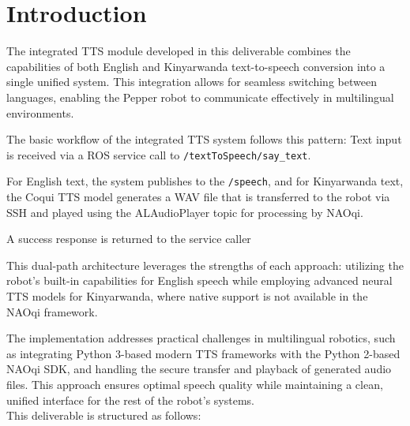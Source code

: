 \documentclass{CSSRforAfrica}
\begin{document}
\newpage
 
 
\pagebreak
\tableofcontents
\newpage


\section{Introduction}

The integrated TTS module developed in this deliverable combines the capabilities of both English and Kinyarwanda text-to-speech conversion into a single unified system. This integration allows for seamless switching between languages, enabling the Pepper robot to communicate effectively in multilingual environments.

The basic workflow of the integrated TTS system follows this pattern:
 Text input is received via a ROS service call to \texttt{/textToSpeech/say\_text}.

For English text, the system publishes to the \texttt{/speech}, and
for Kinyarwanda text, the Coqui TTS model generates a WAV file that is transferred to the robot via SSH and played using the ALAudioPlayer topic for processing by NAOqi.

 A success response is returned to the service caller

This dual-path architecture leverages the strengths of each approach: utilizing the robot's built-in capabilities for English speech while employing advanced neural TTS models for Kinyarwanda, where native support is not available in the NAOqi framework.

The implementation addresses practical challenges in multilingual robotics, such as integrating Python 3-based modern TTS frameworks with the Python 2-based NAOqi SDK, and handling the secure transfer and playback of generated audio files. This approach ensures optimal speech quality while maintaining a clean, unified interface for the rest of the robot's systems.
\\
This deliverable is structured as follows:
\end{document}
